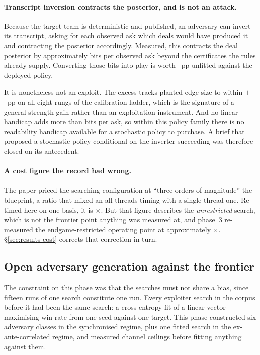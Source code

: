 \paragraph{Transcript inversion contracts the posterior, and is not an attack.} Because the target
team is deterministic and published, an adversary can invert its transcript, asking for each observed
ask which deals would have produced it and contracting the posterior accordingly. Measured, this
contracts the deal posterior by approximately \vsevenBitsPerAsk{} bits per observed ask beyond the
certificates the rules already supply. Converting those bits into play is worth
\vsevenInversionUnfitted{}~pp unfitted against the deployed policy.

It is nonetheless not an exploit. The excess tracks planted-edge size to within
$\pm$\vsevenInversionTrack{}~pp on all eight rungs of the calibration ladder, which is the signature
of a general strength gain rather than an exploitation instrument. And no linear handicap adds more
than \vsevenHandicapBits{} bits per ask, so within this policy family there is no readability
handicap available for a stochastic policy to purchase. A brief that proposed a stochastic policy
conditional on the inverter succeeding was therefore closed on its antecedent.

\paragraph{A cost figure the record had wrong.} The \vsix{} paper priced the searching configuration
at ``three orders of magnitude'' the blueprint, a ratio that mixed an all-threads timing with a
single-thread one. Re-timed here on one basis, it is \vsevenPhaseOneCost$\times$. But that figure
describes the \emph{unrestricted} search, which is not the frontier point anything was measured at,
and phase~3 re-measured the endgame-restricted operating point at approximately
\vsevenCostRecorded$\times$. \S\ref{sec:results-cost} corrects that correction in turn.

\subsection{Open adversary generation against the frontier}
\label{sec:development-adversaries}

The constraint on this phase was that the searches must not share a bias, since fifteen runs of one
search constitute one run. Every exploiter search in the corpus before it had been the same search: a
cross-entropy fit of a linear vector maximising win rate from one seed against one target. This phase
constructed six adversary classes in the synchronised regime, plus one fitted search in the
ex-ante-correlated regime, and measured channel ceilings before fitting anything against them.

